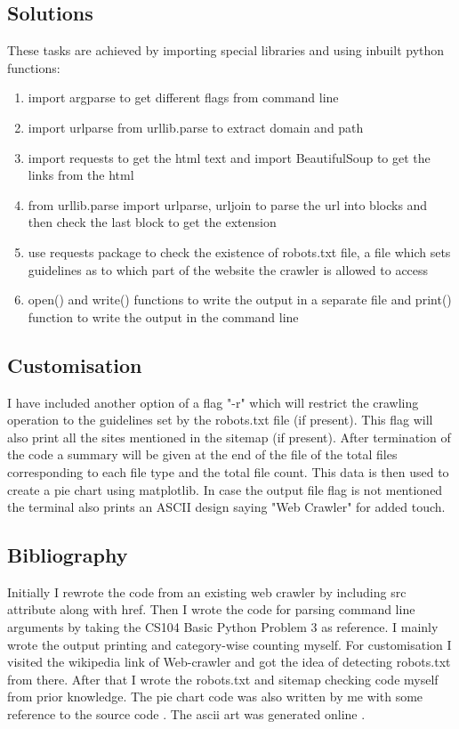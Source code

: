 \documentclass{article}
\begin{document}
\subsection{Solutions}

These tasks are achieved by importing special libraries and using inbuilt python functions:
\begin{enumerate}
    \item import argparse to get different flags from command line
    \item import urlparse from urllib.parse to extract domain and path
    \item import requests to get the html text and import BeautifulSoup to get the links from the html
    \item from urllib.parse import urlparse, urljoin to parse the url into blocks and then check the last block to get the extension
    \item use requests package to check the existence of robots.txt file, a file which sets guidelines as to which part of the website the crawler is allowed to access
    \item open() and write() functions to write the output in a separate file and print() function to write the output in the command line
\end{enumerate}

\subsection{Customisation}
    I have included another option of a flag "-r" which will restrict the crawling operation to the guidelines set by the robots.txt file (if present). This flag will also print all the sites mentioned in the sitemap (if present). After termination of the code a summary will be given at the end of the file of the total files corresponding to each file type and the total file count. This data is then used to create a pie chart using matplotlib.
    In case the output file flag is not mentioned the terminal also prints an ASCII design saying "Web Crawler" for added touch.

\subsection{Bibliography}
    Initially I rewrote the code from an existing web crawler \cite{gfg} by including src attribute along with href. Then I wrote the code for parsing command line arguments by taking the CS104 Basic Python Problem 3 as reference. I mainly wrote the output printing and category-wise counting myself. For customisation I visited the wikipedia link of Web-crawler and got the idea of detecting robots.txt from there. \cite{wkpd} After that I wrote the robots.txt and sitemap checking code myself from prior knowledge. The pie chart code was also written by me with some reference to the source code \cite{pie}. The ascii art was generated online \cite{art}. 
\end{document}
